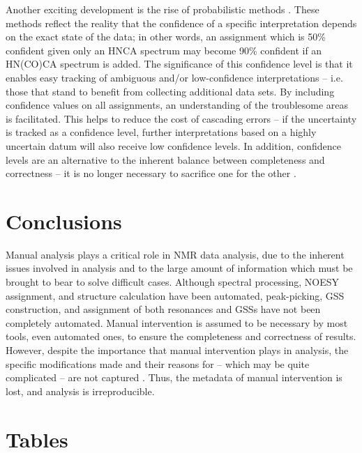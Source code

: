 Another exciting development is the rise of probabilistic methods 
\cite{saga, pine}.  These methods reflect the reality that the 
confidence of a specific interpretation depends on the exact state of the 
data; in other words, an assignment which is 50\% confident given only an 
HNCA spectrum may become 90\% confident if an HN(CO)CA spectrum is added.  
The significance of this confidence level is that it enables easy tracking 
of ambiguous and/or low-confidence interpretations -- i.e. those that stand 
to benefit from collecting additional data sets.  By including confidence 
values on all assignments, an understanding of the troublesome areas is 
facilitated.  This helps to reduce the cost of cascading errors -- if the 
uncertainty is tracked as a confidence level, further interpretations based 
on a highly uncertain datum will also receive low confidence levels.  In 
addition, confidence levels are an alternative to the inherent balance 
between completeness and correctness -- it is no longer necessary to 
sacrifice one for the other \cite{autoassign2001, pine}.


\section{Conclusions}

Manual analysis plays a critical role in NMR data analysis, due to the inherent 
issues involved in analysis and to the large amount of information which must 
be brought to bear to solve difficult cases.  Although spectral processing, 
NOESY assignment, and structure calculation have been automated, peak-picking, 
GSS construction, and assignment of both resonances and GSSs have not been 
completely automated.  Manual intervention is assumed to be necessary by 
most tools, even automated ones, to ensure the completeness and correctness 
of results.  However, despite the importance that manual intervention plays 
in analysis, the specific modifications made and their reasons for -- 
which may be quite complicated -- are not captured \cite{guntert2009automated}.  
Thus, the metadata of manual intervention is lost, and analysis is 
irreproducible.


\clearpage
\section{Tables}

